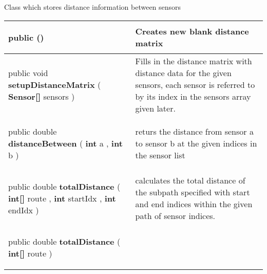  {\scriptsize Class which stores distance information between sensors
 
\vspace*{-5pt} 
\begin{tabularx}{\linewidth}{m{}|m{}}
\label{tab:DistanceMatrix}
\begin{raggedleft}public  \textbf{\hyperref[tab:DistanceMatrix]{\color{blue}{DistanceMatrix}}}()
\end{raggedleft} &
 Creates new blank distance matrix\\ \hline 
\begin{raggedleft}public void \textbf{setupDistanceMatrix }(\hspace*{ 5pt} \textbf{Sensor{[}{]}} sensors  )
\end{raggedleft} &
 Fills in the distance matrix with distance data for the given sensors, each sensor is referred to by its index in the sensors array given later.\\ \hline 
\begin{raggedleft}public double \textbf{distanceBetween }(\newline \hfill 
\hspace*{ 5pt} \textbf{int} a , \newline
 \hspace*{ 5pt} \textbf{int} b  )
\end{raggedleft} &
 returs the distance from sensor a to sensor b at the given indices in the sensor list\\ \hline 
\begin{raggedleft}public double \textbf{totalDistance }(\newline \hfill 
\hspace*{ 5pt} \textbf{int{[}{]}} route , \newline
 \hspace*{ 5pt} \textbf{int} startIdx , \newline
 \hspace*{ 5pt} \textbf{int} endIdx  )
\end{raggedleft} &
 calculates the total distance of the subpath specified with start and end indices within the given path of sensor indices.\\ \hline 
\begin{raggedleft}public double \textbf{totalDistance }(\hspace*{ 5pt} \textbf{int{[}{]}} route  )
\end{raggedleft} &

\end{tabularx}}
